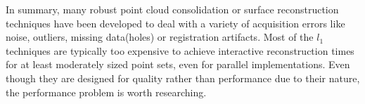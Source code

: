In summary, many robust point cloud consolidation or surface reconstruction techniques have been developed to deal with a variety of acquisition errors like noise, outliers, missing data(holes) or registration artifacts. Most of the $l_1$ techniques are typically too expensive to achieve interactive reconstruction times for at least moderately sized point sets, even for parallel implementations. Even though they are designed for quality rather than performance due to their nature, the performance problem is worth researching. 